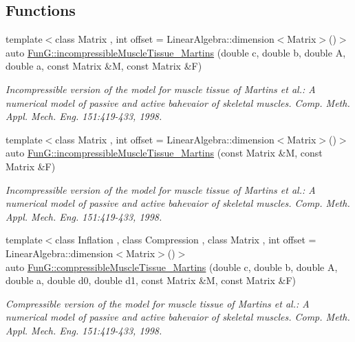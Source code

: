 \subsection*{Functions}
\begin{DoxyCompactItemize}
\item 
{\footnotesize template$<$class Matrix , int offset = Linear\-Algebra\-::dimension$<$\-Matrix$>$()$>$ }\\auto \hyperlink{group__Biomechanics_gafcc36a1958899ca9246c4c1b3c9bfd85}{Fun\-G\-::incompressible\-Muscle\-Tissue\-\_\-\-Martins} (double c, double b, double A, double a, const Matrix \&M, const Matrix \&F)
\begin{DoxyCompactList}\small\item\em Incompressible version of the model for muscle tissue of Martins et al.\-: A numerical model of passive and active bahevaior of skeletal muscles. Comp. Meth. Appl. Mech. Eng. 151\-:419-\/433, 1998. \end{DoxyCompactList}\item 
{\footnotesize template$<$class Matrix , int offset = Linear\-Algebra\-::dimension$<$\-Matrix$>$()$>$ }\\auto \hyperlink{group__Biomechanics_ga9e414585a90b1988e9fa88d17d875055}{Fun\-G\-::incompressible\-Muscle\-Tissue\-\_\-\-Martins} (const Matrix \&M, const Matrix \&F)
\begin{DoxyCompactList}\small\item\em Incompressible version of the model for muscle tissue of Martins et al.\-: A numerical model of passive and active bahevaior of skeletal muscles. Comp. Meth. Appl. Mech. Eng. 151\-:419-\/433, 1998. \end{DoxyCompactList}\item 
{\footnotesize template$<$class Inflation , class Compression , class Matrix , int offset = Linear\-Algebra\-::dimension$<$\-Matrix$>$()$>$ }\\auto \hyperlink{group__Biomechanics_gad831914c493a3da04ed40c3c0ce87a62}{Fun\-G\-::compressible\-Muscle\-Tissue\-\_\-\-Martins} (double c, double b, double A, double a, double d0, double d1, const Matrix \&M, const Matrix \&F)
\begin{DoxyCompactList}\small\item\em Compressible version of the model for muscle tissue of Martins et al.\-: A numerical model of passive and active bahevaior of skeletal muscles. Comp. Meth. Appl. Mech. Eng. 151\-:419-\/433, 1998. \end{DoxyCompactList}\item 

\end{DoxyCompactItemize}

